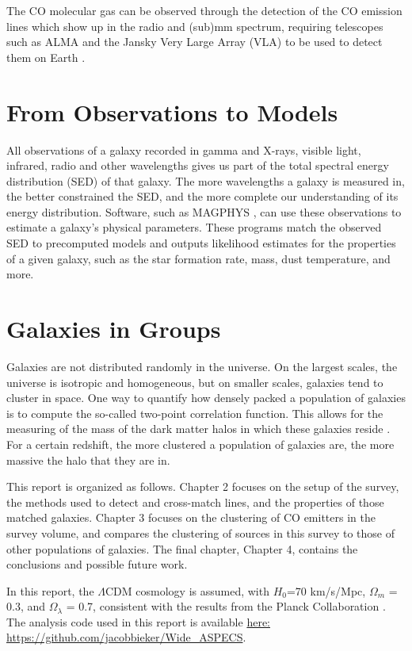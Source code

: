 \documentclass[twoside,single]{lion-msc}
\begin{document}
The CO molecular gas can be observed through the detection of the CO emission lines which show up in the radio and (sub)mm spectrum, requiring telescopes such as ALMA and the Jansky Very Large Array (VLA) to be used to detect them on Earth \cite{decarli2019alma}. 

\section{From Observations to Models}

All observations of a galaxy recorded in gamma and X-rays, visible light, infrared, radio and other wavelengths gives us part of the total spectral energy distribution (SED) of that galaxy. The more wavelengths a galaxy is measured in, the better constrained the SED, and the more complete our understanding of its energy distribution. Software, such as MAGPHYS \cite{da2008simple, da2015alma}, can use these observations to estimate a galaxy's physical parameters. These programs match the observed SED to precomputed models and outputs likelihood estimates for the properties of a given galaxy, such as the star formation rate, mass, dust temperature, and more.

\section{Galaxies in Groups}

Galaxies are not distributed randomly in the universe. On the largest scales, the universe is isotropic and homogeneous, but on smaller scales, galaxies tend to cluster in space. One way to quantify how densely packed a population of galaxies is to compute the so-called two-point correlation function. This allows for the measuring of the mass of the dark matter halos in which these galaxies reside \cite{hickox2011clustering}. For a certain redshift, the more clustered a population of galaxies are, the more massive the halo that they are in.

This report is organized as follows. Chapter 2 focuses on the setup of the survey, the methods used to detect and cross-match lines, and the properties of those matched galaxies. Chapter 3 focuses on the clustering of CO emitters in the survey volume, and compares the clustering of sources in this survey to those of other populations of galaxies. The final chapter, Chapter 4, contains the conclusions and possible future work. 

In this report, the $\Lambda$CDM cosmology is assumed, with $H_0$=70 km/s/Mpc, $\Omega_m$ = 0.3, and $\Omega_{\lambda}$ = 0.7, consistent with the results from the Planck Collaboration \cite{ade2016planck}. The analysis code used in this report is available \href{https://github.com/jacobbieker/Wide\_ASPECS}{here: https://github.com/jacobbieker/Wide\_ASPECS}. 
\end{document}
